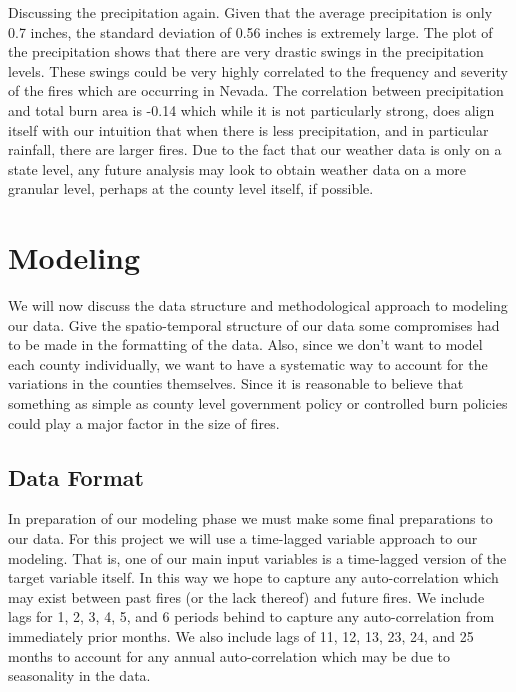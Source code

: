 \documentclass[12pt]{article}
\begin{document}
Discussing the precipitation again. Given that the average precipitation is only 0.7 inches, the standard deviation of 0.56 inches is extremely large. The plot of the precipitation shows that there are very drastic swings in the precipitation levels. These swings could be very highly correlated to the frequency and severity of the fires which are occurring in Nevada. The correlation between precipitation and total burn area is -0.14 which while it is not particularly strong, does align itself with our intuition that when there is less precipitation, and in particular rainfall, there are larger fires. Due to the fact that our weather data is only on a state level, any future analysis may look to obtain weather data on a more granular level, perhaps at the county level itself, if possible. 

\section{\textrm{Modeling}}

We will now discuss the data structure and methodological approach to modeling our data. Give the spatio-temporal structure of our data some compromises had to be made in the formatting of the data. Also, since we don't want to model each county individually, we want to have a systematic way to account for the variations in the counties themselves. Since it is reasonable to believe that something as simple as county level government policy or controlled burn policies could play a major factor in the size of fires. 

\subsection{\textrm{Data Format}}

In preparation of our modeling phase we must make some final preparations to our data. For this project we will use a time-lagged variable approach to our modeling. That is, one of our main input variables is a time-lagged version of the target variable itself. In this way we hope to capture any auto-correlation which may exist between past fires (or the lack thereof) and future fires. We include lags for 1, 2, 3, 4, 5, and 6 periods behind to capture any auto-correlation from immediately prior months. We also include lags of 11, 12, 13, 23, 24, and 25 months to account for any annual auto-correlation which may be due to seasonality in the data. \\
\end{document}
